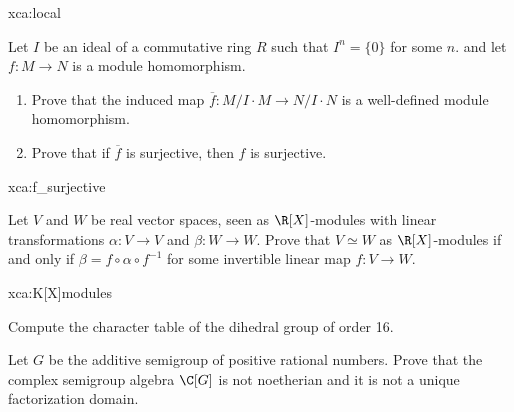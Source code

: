 \begin{sol}{xca:local}

\end{sol}

\begin{exercise}
\label{xca:f_surjective}
    Let $I$ be an ideal of a commutative ring $R$ such that $I^n=\{0\}$ for some $n$. 
    and let $f\colon M\to N$ is a module homomorphism.
    \begin{enumerate} 
    \item Prove that the induced map 
    $\overline{f}\colon M/I\cdot M\to N/I\cdot N$ is a well-defined module
    homomorphism. 
    \item Prove that if $\overline{f}$ is surjective, then $f$ is surjective.
    \end{enumerate}
\end{exercise}

\begin{sol}{xca:f_surjective}
\end{sol}

\begin{exercise}
\label{xca:K[X]modules}
    Let $V$ and $W$ be real vector spaces, seen as $\R[X]$-modules
    with linear transformations $\alpha\colon V\to V$ and $\beta\colon W\to W$. Prove
    that $V\simeq W$ as $\R[X]$-modules if and only if $\beta=f\circ \alpha\circ f^{-1}$ 
    for some invertible linear map $f\colon V\to W$. 
\end{exercise}

\begin{sol}{xca:K[X]modules}
\end{sol}

\begin{exercise}
    Compute the character table of the dihedral group of order 16. 
\end{exercise}

\begin{exercise}
    Let $G$ be the additive semigroup of positive rational numbers. Prove that 
    the complex semigroup algebra $\C[G]$ is not noetherian 
    and it is not a unique factorization domain. 
\end{exercise}